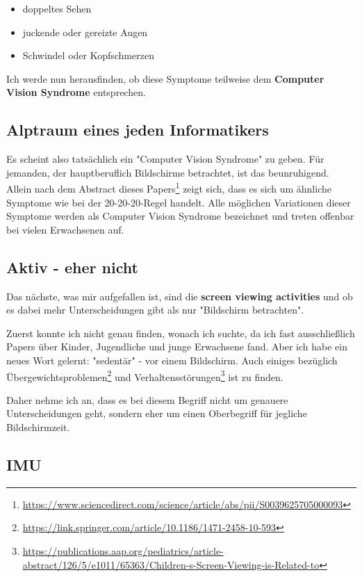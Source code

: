 \begin{itemize}
  \item doppeltes Sehen
  \item juckende oder gereizte Augen
  \item Schwindel oder Kopfschmerzen
\end{itemize}

Ich werde nun herausfinden, ob diese Symptome teilweise dem \textbf{Computer Vision Syndrome} entsprechen.

\subsection{Alptraum eines jeden Informatikers}

Es scheint also tatsächlich ein "Computer Vision Syndrome" zu geben. Für jemanden, der hauptberuflich Bildschirme betrachtet, ist das beunruhigend. Allein nach dem Abstract dieses Papers\footnote{\url{https://www.sciencedirect.com/science/article/abs/pii/S0039625705000093}} zeigt sich, dass es sich um ähnliche Symptome wie bei der 20-20-20-Regel handelt. Alle möglichen Variationen dieser Symptome werden als Computer Vision Syndrome bezeichnet und treten offenbar bei vielen Erwachsenen auf.

\subsection{Aktiv - eher nicht}

Das nächste, was mir aufgefallen ist, sind die \textbf{screen viewing activities} und ob es dabei mehr Unterscheidungen gibt als nur "Bildschirm betrachten".

Zuerst konnte ich nicht genau finden, wonach ich suchte, da ich fast ausschließlich Papers über Kinder, Jugendliche und junge Erwachsene fand. Aber ich habe ein neues Wort gelernt: "sedentär" - vor einem Bildschirm. Auch einiges bezüglich Übergewichtsproblemen\footnote{\url{https://link.springer.com/article/10.1186/1471-2458-10-593}} und Verhaltensstörungen\footnote{\url{https://publications.aap.org/pediatrics/article-abstract/126/5/e1011/65363/Children-s-Screen-Viewing-is-Related-to}} ist zu finden.

Daher nehme ich an, dass es bei diesem Begriff nicht um genauere Unterscheidungen geht, sondern eher um einen Oberbegriff für jegliche Bildschirmzeit.

\subsection{IMU}

